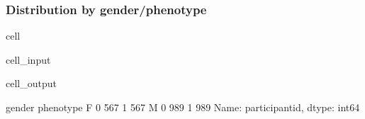 \documentclass[letterpaper,10pt,english]{jupyterBook}
\begin{document}
\subsubsection{Distribution by gender/phenotype}
\label{\detokenize{Cooper:distribution-by-gender-phenotype}}
\begin{sphinxuseclass}{cell}\begin{sphinxVerbatimInput}

\begin{sphinxuseclass}{cell_input}
\begin{sphinxVerbatim}[commandchars=\\\{\}]
\PYG{p}{[} \PYG{p}{]}\PYG{p}{[}\PYG{p}{]}
\end{sphinxVerbatim}

\end{sphinxuseclass}\end{sphinxVerbatimInput}
\begin{sphinxVerbatimOutput}

\begin{sphinxuseclass}{cell_output}
\begin{sphinxVerbatim}[commandchars=\\\{\}]
gender  phenotype
F       0            567
        1            567
M       0            989
        1            989
Name: participant\PYGZus{}id, dtype: int64
\end{sphinxVerbatim}

\end{sphinxuseclass}\end{sphinxVerbatimOutput}

\end{sphinxuseclass}
\end{document}
